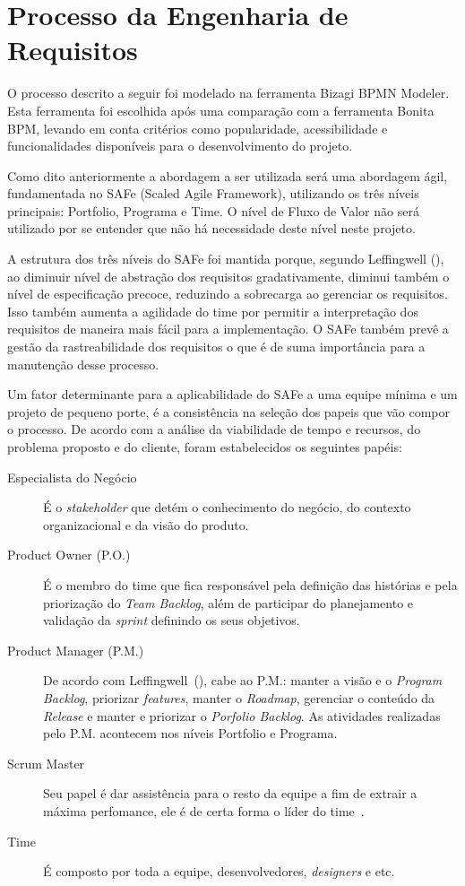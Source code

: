 \chapter[Processo da Engenharia de Requisitos]{Processo da Engenharia de Requisitos}
O processo descrito a seguir foi modelado na ferramenta Bizagi BPMN Modeler. Esta ferramenta foi escolhida após uma comparação com a ferramenta Bonita BPM, levando em conta critérios como popularidade, acessibilidade e funcionalidades disponíveis para o desenvolvimento do projeto.

Como dito anteriormente a abordagem a ser utilizada será uma abordagem ágil, fundamentada no SAFe (Scaled Agile Framework), utilizando os três níveis principais: Portfolio, Programa e Time. O nível de Fluxo de Valor não será utilizado por se entender que não há necessidade deste nível neste projeto.

A estrutura dos três níveis do SAFe foi mantida porque, segundo Leffingwell (\citeyear{leffingwell}), ao diminuir nível de abstração dos requisitos gradativamente, diminui também o nível de especificação precoce, reduzindo a sobrecarga ao gerenciar os requisitos. Isso também aumenta a agilidade do time por permitir a interpretação dos requisitos de maneira mais fácil para a implementação. O SAFe também prevê a gestão da rastreabilidade dos requisitos o que é de suma importância para a manutenção desse processo.

Um fator determinante para a aplicabilidade do SAFe a uma equipe mínima e um projeto de pequeno porte, é a consistência na seleção dos papeis que vão compor o processo. De acordo com a análise da viabilidade de tempo e recursos, do problema proposto e do cliente, foram estabelecidos os seguintes papéis:

\begin{description}
\item[Especialista do Negócio] É o \textit{stakeholder} que detém o conhecimento do negócio, do contexto organizacional e da visão do produto.    
\item[Product Owner (P.O.)] É o membro do time que fica responsável pela definição das histórias e pela priorização do \textit{Team Backlog}, além de participar do planejamento e validação da \textit{sprint} definindo os seus objetivos.
\item[Product Manager (P.M.)] De acordo com Leffingwell~(\citeyear{leffingwell}), cabe ao P.M.: manter a visão e o \textit{Program Backlog}, priorizar \textit{features}, manter o \textit{Roadmap}, gerenciar o conteúdo da \textit{Release} e manter e priorizar o \textit{Porfolio Backlog}. As atividades realizadas pelo P.M. acontecem nos níveis Portfolio e Programa.
\item[Scrum Master] Seu papel é dar assistência para o resto da equipe a fim de extrair a máxima perfomance, ele é de certa forma o líder do time~\cite{leffingwell}.
\item[Time] É composto por toda a equipe, desenvolvedores, \textit{designers} e etc.
\end{description}

